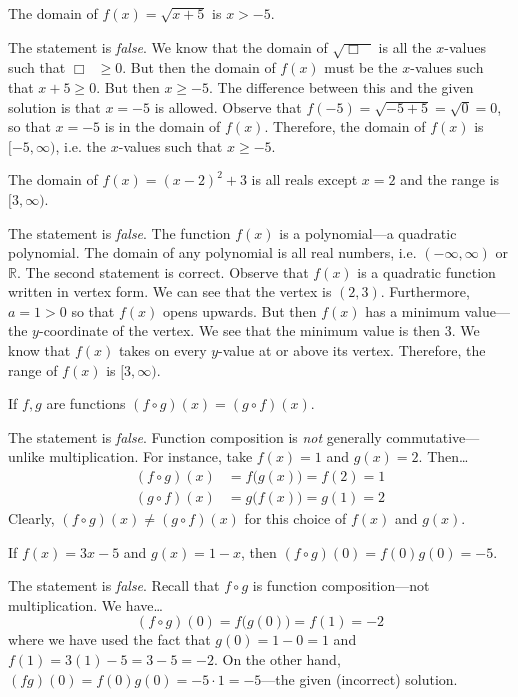 \documentclass[11pt,letterpaper]{article}
\begin{document}
 The domain of $f(x)= \sqrt{x + 5}$ is $x > -5$. \pspace

\sol The statement is \textit{false}. We know that the domain of $\sqrt{\Box{\phantom{x}}\!\!\!}$ is all the $x$-values such that $\Box{\phantom{x}}\!\!\! \geq 0$. But then the domain of $f(x)$ must be the $x$-values such that $x + 5 \geq 0$. But then $x \geq -5$. The difference between this and the given solution is that $x= -5$ is allowed. Observe that $f(-5)= \sqrt{-5 + 5}= \sqrt{0}= 0$, so that $x= -5$ is in the domain of $f(x)$. Therefore, the domain of $f(x)$ is $[-5, \infty)$, i.e. the $x$-values such that $x \geq -5$. \pvspace{1.3cm}



 The domain of $f(x)= (x - 2)^2 + 3$ is all reals except $x= 2$ and the range is $[3, \infty)$. \pspace

\sol The statement is \textit{false}. The function $f(x)$ is a polynomial---a quadratic polynomial. The domain of any polynomial is all real numbers, i.e. $(-\infty, \infty)$ or $\mathbb{R}$. The second statement is correct. Observe that $f(x)$ is a quadratic function written in vertex form. We can see that the vertex is $(2, 3)$. Furthermore, $a= 1 > 0$ so that $f(x)$ opens upwards. But then $f(x)$ has a minimum value---the $y$-coordinate of the vertex. We see that the minimum value is then $3$. We know that $f(x)$ takes on every $y$-value at or above its vertex. Therefore, the range of $f(x)$ is $[3, \infty)$. \pvspace{1.3cm}



 If $f, g$ are functions $(f \circ g)(x)= (g \circ f)(x)$. \pspace

\sol The statement is \textit{false}. Function composition is \textit{not} generally commutative---unlike multiplication. For instance, take $f(x)= 1$ and $g(x)= 2$. Then\dots
	\[
	\begin{aligned}
	(f \circ g)(x)&= f \big( g(x) \big)= f(2)= 1 \\[0.3cm]
	(g \circ f)(x)&= g \big( f(x) \big)= g(1)= 2
	\end{aligned}
	\]
Clearly, $(f \circ g)(x) \neq (g \circ f)(x)$ for this choice of $f(x)$ and $g(x)$. \pvspace{1.3cm}



 If $f(x)= 3x - 5$ and $g(x) = 1 - x$, then $(f \circ g)(0)= f(0) g(0)= -5$. \pspace

\sol The statement is \textit{false}. Recall that $f \circ g$ is function composition---not multiplication. We have\dots
	\[
	(f \circ g)(0)= f \big( g(0) \big)= f(1)= -2
	\]
where we have used the fact that $g(0)= 1 - 0= 1$ and $f(1)= 3(1) - 5= 3 - 5= -2$. On the other hand, $(fg)(0)= f(0) g(0)= -5 \cdot 1= -5$---the given (incorrect) solution. \pvspace{1.3cm}
\end{document}

